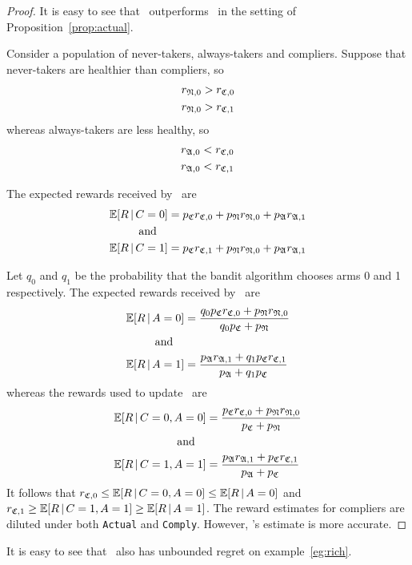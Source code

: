 \begin{proof}
	It is easy to see that \comply\, outperforms \chosen\, in the setting of Proposition~\ref{prop:actual}.
	
	Consider a population of never-takers, always-takers and compliers. Suppose that never-takers are healthier than compliers, so
	\begin{align}
	   r_{{\mathfrak N},0}> r_{{\mathfrak C},0}\\
	   r_{{\mathfrak N},0}> r_{{\mathfrak C},1}
	\end{align}
	whereas always-takers are less healthy, so
	\begin{align}
	   r_{{\mathfrak A},0}< r_{{\mathfrak C},0}\\
	   r_{{\mathfrak A},0}< r_{{\mathfrak C},1}
	\end{align}

    The expected rewards received by \chosen\, are
	\begin{align}
		\operatorname*{\mathbb E}[R\,|\,C=0]
		& = p_{{\mathfrak C}}r_{{\mathfrak C},0} + p_{\mathfrak N} r_{{\mathfrak N},0} + p_{\mathfrak A} r_{{\mathfrak A},1}\\
		\quad\text{and}\quad\\
		\operatorname*{\mathbb E}[R\,|\,C=1]
		& = p_{{\mathfrak C}}r_{{\mathfrak C},1} + p_{\mathfrak N} r_{{\mathfrak N},0} + p_{\mathfrak A} r_{{\mathfrak A},1}
	\end{align}
	
	Let $q_0$ and $q_1$ be the probability that the bandit algorithm chooses arms 0 and 1 respectively. The expected rewards received by \actual\, are
	\begin{align}
		\operatorname*{\mathbb E}[R\,|\,A=0]
		& = \frac{q_0 p_{{\mathfrak C}}r_{{\mathfrak C},0} + p_{\mathfrak N} r_{{\mathfrak N},0}}{q_0p_{\mathfrak C} + p_{\mathfrak N}}\\
		\quad\text{and}\quad\\
		\operatorname*{\mathbb E}[R\,|\,A=1]
		& = \frac{p_{\mathfrak A} r_{{\mathfrak A},1} + q_1p_{\mathfrak C} r_{{\mathfrak C},1}}{p_{\mathfrak A} + q_1 p_{\mathfrak C}}
	\end{align}
	whereas the rewards used to update \comply\, are
	\begin{align}
		\operatorname*{\mathbb E}[R\,|\,C=0,A=0] &= \frac{p_{{\mathfrak C}}r_{{\mathfrak C},0} + p_{\mathfrak N} r_{{\mathfrak N},0}}{p_{\mathfrak C} + p_{\mathfrak N}}\\
		\quad\text{and}\quad\\
		\operatorname*{\mathbb E}[R\,|\,C=1,A=1] &= \frac{p_{\mathfrak A} r_{{\mathfrak A},1} + p_{{\mathfrak C}}r_{{\mathfrak C},1}}{p_{\mathfrak A} + p_{\mathfrak C}}
	\end{align}
	It follows that $r_{{\mathfrak C},0} \leq\operatorname*{\mathbb E}[R\,|\,C=0,A=0]\leq \operatorname*{\mathbb E}[R\,|\,A=0]$ and $r_{{\mathfrak C},1} \geq\operatorname*{\mathbb E}[R\,|\,C=1,A=1] \geq \operatorname*{\mathbb E}[R\,|\,A=1]$.
	The reward estimates for compliers are diluted under both \texttt{Actual} and \texttt{Comply}. However, \comply's estimate is more accurate.
\end{proof}

It is easy to see that \comply\, also has unbounded regret on example~\ref{eg:rich}.


